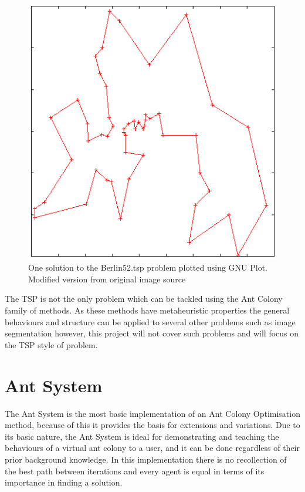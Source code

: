 \begin{figure}[h!]
\centering
\includegraphics[scale=0.7]{Images/chapter1/tsp52}
\caption[Example Berlin52.tsp Solution]{One solution to the Berlin52.tsp problem plotted using GNU Plot. Modified version from original image source \cite{berlin52:image}}
\label{fig:berlin52}
\end{figure}

The TSP is not the only problem which can be tackled using the Ant Colony family of methods. As these methods have metaheuristic properties the general behaviours and structure can be applied to several other problems such as image segmentation however, this project will not cover such problems and will focus on the TSP style of problem.

\section{Ant System}
\label{sec:AntSystem}
The Ant System is the most basic implementation of an Ant Colony Optimisation method, because of this it provides the basis for extensions and variations. Due to its basic nature, the Ant System is ideal for demonstrating and teaching the behaviours of a virtual ant colony to a user, and it can be done regardless of their prior background knowledge. In this implementation there is no recollection of the best path between iterations and every agent is equal in terms of its importance in finding a solution.

